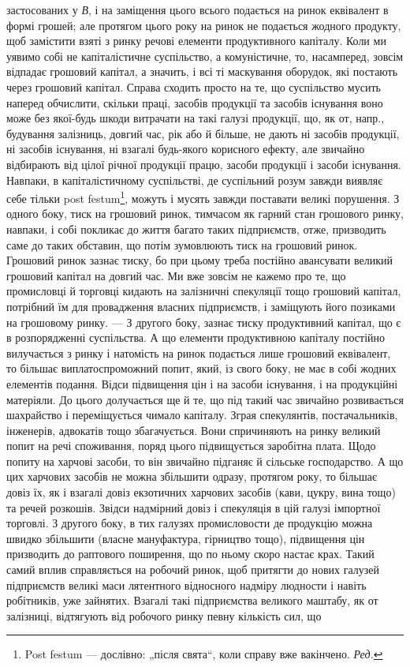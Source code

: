 \parcont{}  %
застосованих у \emph{В}, і на заміщення цього всього подається на ринок еквівалент
в формі грошей; але протягом цього року на ринок не подається
жодного продукту, щоб замістити взяті з ринку речові елементи продуктивного
капіталу. Коли ми уявимо собі не капіталістичне суспільство,
а комуністичне, то, насамперед, зовсім відпадає грошовий капітал, а значить,
і всі ті маскування оборудок, які постають через грошовий капітал.
Справа сходить просто на те, що суспільство мусить наперед обчислити,
скільки праці, засобів продукції та засобів існування воно може без якої-будь
шкоди витрачати на такі галузі продукції, що, як от, напр., будування
залізниць, довгий час, рік або й більше, не дають ні засобів
продукції, ні засобів існування, ні взагалі будь-якого корисного ефекту,
але звичайно відбирають від цілої річної продукції працю, засоби продукції
і засоби існування. Навпаки, в капіталістичному суспільстві, де
суспільний розум завжди виявляє себе тільки post festum\footnote*{
Post festum — дослівно: „після свята“, коли справу вже вакінчено. \emph{Ред.}
}, можуть і мусять
завжди поставати великі порушення. З одного боку, тиск на грошовий
ринок, тимчасом як гарний стан грошового ринку, навпаки, і собі покликає
до життя багато таких підприємств, отже, призводить саме до таких обставин,
що потім зумовлюють тиск на грошовий ринок. Грошовий ринок
зазнає тиску, бо при цьому треба постійно авансувати великий грошовий
капітал на довгий час. Ми вже зовсім не кажемо про те, що промисловці
й торговці кидають на залізничні спекуляції тощо грошовий капітал,
потрібний їм для провадження власних підприємств, і заміщують його позиками
на грошовому ринку. — З другого боку, зазнає тиску продуктивний капітал,
що є в розпорядженні суспільства. А що елементи продуктивною капіталу
постійно вилучається з ринку і натомість на ринок подається лише
грошовий еквівалент, то більшає виплатоспроможний попит, який, із свого
боку, не має в собі жодних елементів подання. Відси підвищення цін
і на засоби існування, і на продукційні матеріяли. До цього долучається
ще й те, що під такий час звичайно розвивається шахрайство і переміщується
чимало капіталу. Зграя спекулянтів, постачальників, інженерів,
адвокатів тощо збагачується. Вони спричиняють на ринку великий попит
на речі споживання, поряд цього підвищується заробітна плата. Щодо
попиту на харчові засоби, то він звичайно підганяє й сільське господарство.
А що цих харчових засобів не можна збільшити одразу, протягом
року, то більшає довіз їх, як і взагалі довіз екзотичних харчових
засобів (кави, цукру, вина тощо) та речей розкошів. Звідси надмірний
довіз і спекуляція в цій галузі імпортної торговлі. З другого боку, в
тих галузях промисловости де продукцію можна швидко збільшити (власне
мануфактура, гірництво тощо), підвищення цін призводить до раптового
поширення, що по ньому скоро настає крах. Такий самий вплив
справляється на робочий ринок, щоб притягти до нових галузей підприємств
великі маси лятентного відносного надміру людности і навіть робітників,
уже зайнятих. Взагалі такі підприємства великого маштабу, як
от залізниці, відтягують від робочого ринку певну кількість сил, що
\parbreak{}  %
